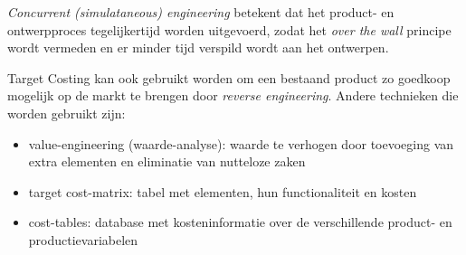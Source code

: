 \documentclass[../../samenvatting.tex]{subfiles}
\begin{document}
\emph{Concurrent (simulataneous) engineering} betekent dat het product- en ontwerpproces tegelijkertijd worden uitgevoerd, zodat het \emph{over the wall} principe wordt vermeden en er minder tijd verspild wordt aan het ontwerpen.

Target Costing kan ook gebruikt worden om een bestaand product zo goedkoop mogelijk op de markt te brengen door \emph{reverse engineering}. Andere technieken die worden gebruikt zijn:
\begin{itemize}
    \item value-engineering (waarde-analyse): waarde te verhogen door toevoeging van extra elementen en eliminatie van nutteloze zaken
    \item target cost-matrix: tabel met elementen, hun functionaliteit en kosten
    \item cost-tables: database met kosteninformatie over de verschillende product- en productievariabelen
\end{itemize}
\end{document}
